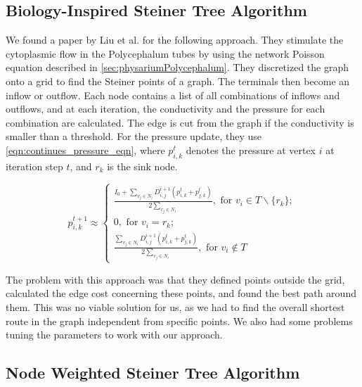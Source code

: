 \subsection{Biology-Inspired Steiner Tree Algorithm}
\label{sec:biology_approach}

We found a paper by Liu et al. \cite{liu_physarum_2015} for the following approach. They stimulate the cytoplasmic flow in the Polycephalum tubes by using the network Poisson equation described in \autoref{sec:physariumPolycephalum}. They discretized the graph onto a grid to find the Steiner points of a graph. The terminals then become an inflow or outflow. Each node contains a list of all combinations of inflows and outflows, and at each iteration, the conductivity and the pressure for each combination are calculated. The edge is cut from the graph if the conductivity is smaller than a threshold. For the pressure update, they use \autoref{eqn:continues_pressure_eqn}, where $p_{i,k}^t$ denotes the pressure at vertex $i$ at iteration step $t$, and $r_k$ is the sink node. 

\begingroup
\large
\begin{equation}
    \label{eqn:continues_pressure_eqn}
    p_{i,k}^{t+1} \approx \begin{cases}
        \frac{I_0 + \sum\limits_{v_j \in N_i} D_{i,j}^{i+1}(p_{i,k}^t + p_{j,k}^t)}{2 \sum\limits_{v_j \in N_i}}, \text{ for } v_i \in T \backslash \{r_k\}; \\
        0, \text{ for } v_i = r_k; \\
        \frac{\sum\limits_{v_j \in N_i} D_{i,j}^{i+1}(p_{i,k}^t + p_{j,k}^t)}{2 \sum\limits_{v_j \in N_i}}, \text{ for } v_i \notin T
    \end{cases}
\end{equation}
\endgroup

The problem with this approach was that they defined points outside the grid, calculated the edge cost concerning these points, and found the best path around them. This was no viable solution for us, as we had to find the overall shortest route in the graph independent from specific points. We also had some problems tuning the parameters to work with our approach.

\subsection{Node Weighted Steiner Tree Algorithm}
\label{sec:node_weighted_approach}

